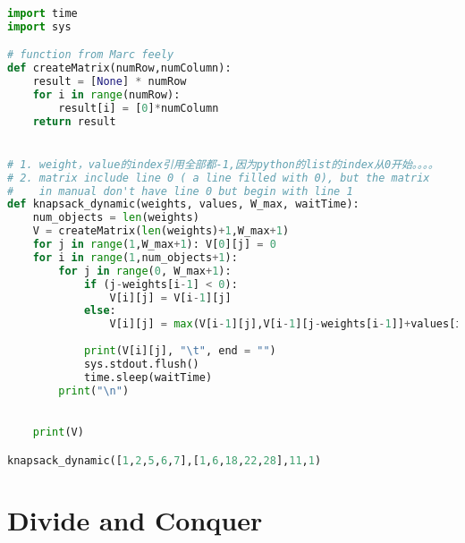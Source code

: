 \documentclass{article}
\theoremstyle{definition}
\theoremstyle{remark}
\begin{document}
\begin{lstlisting}[language = Python, caption = codes pour knapsack2]
	
import time
import sys

# function from Marc feely
def createMatrix(numRow,numColumn):
    result = [None] * numRow
    for i in range(numRow):
        result[i] = [0]*numColumn
    return result


# 1. weight，value的index引用全部都-1,因为python的list的index从0开始。。。。
# 2. matrix include line 0 ( a line filled with 0), but the matrix
#    in manual don't have line 0 but begin with line 1
def knapsack_dynamic(weights, values, W_max, waitTime):
    num_objects = len(weights)
    V = createMatrix(len(weights)+1,W_max+1) 
    for j in range(1,W_max+1): V[0][j] = 0
    for i in range(1,num_objects+1):
        for j in range(0, W_max+1):
            if (j-weights[i-1] < 0): 
                V[i][j] = V[i-1][j]
            else: 
                V[i][j] = max(V[i-1][j],V[i-1][j-weights[i-1]]+values[i-1])
            
            print(V[i][j], "\t", end = "")
            sys.stdout.flush()
            time.sleep(waitTime)
        print("\n")

            
    print(V)

knapsack_dynamic([1,2,5,6,7],[1,6,18,22,28],11,1)
\end{lstlisting}

\section{Divide and Conquer}



    
\end{document}
